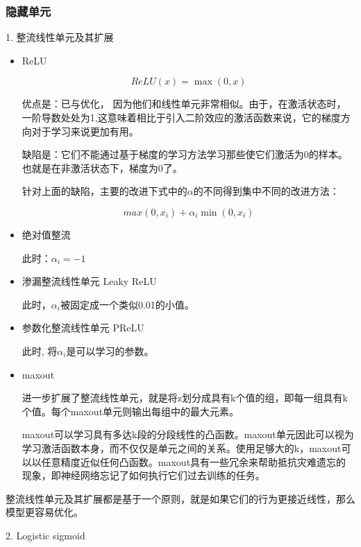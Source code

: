 \subsubsection{隐藏单元}

1. 整流线性单元及其扩展

\begin{itemize}
\item ReLU

\begin{displaymath}
ReLU(x) = \max(0, x)
\end{displaymath}

优点是：已与优化， 因为他们和线性单元非常相似。由于，在激活状态时，一阶导数处处为1,这意味着相比于引入二阶效应的激活函数来说，它的梯度方向对于学习来说更加有用。

缺陷是：它们不能通过基于梯度的学习方法学习那些使它们激活为0的样本。也就是在非激活状态下，梯度为0了。

针对上面的缺陷，主要的改进下式中的$\alpha$的不同得到集中不同的改进方法：

\begin{displaymath}
max(0, x_i) + \alpha_i \min(0, x_i)
\end{displaymath}

\item 绝对值整流

此时：$\alpha_i = -1$

\item 渗漏整流线性单元 Leaky ReLU

此时，$\alpha_i$被固定成一个类似0.01的小值。

\item 参数化整流线性单元 PReLU

此时, 将$\alpha_i$是可以学习的参数。

\item maxout

进一步扩展了整流线性单元，就是将z划分成具有k个值的组，即每一组具有k个值。每个maxout单元则输出每组中的最大元素。

maxout可以学习具有多达k段的分段线性的凸函数。maxout单元因此可以视为学习激活函数本身，而不仅仅是单元之间的关系。使用足够大的k，maxout可以以任意精度近似任何凸函数。maxout具有一些冗余来帮助抵抗灾难遗忘的现象，即神经网络忘记了如何执行它们过去训练的任务。

\end{itemize}

整流线性单元及其扩展都是基于一个原则，就是如果它们的行为更接近线性，那么模型更容易优化。

2. Logistic sigmoid


